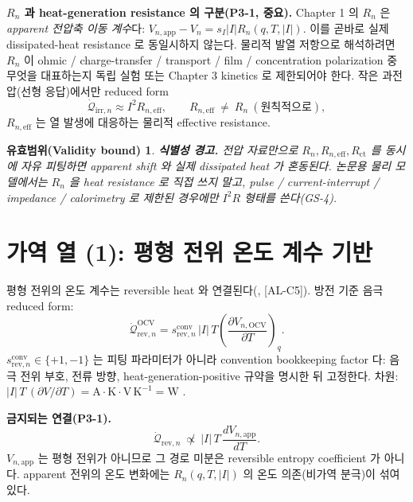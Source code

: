 \documentclass[11pt,a4paper]{article}
\newtheorem*{boundbox}{유효범위(Validity bound)}
\newcommand{\eff}{\mathrm{eff}}
\newcommand{\app}{\mathrm{app}}
\newcommand{\OCV}{\mathrm{OCV}}
\newcommand{\irr}{\mathrm{irr}}
\newcommand{\rev}{\mathrm{rev}}
\newcommand{\conv}{\mathrm{conv}}
\newcommand{\AL}[1]{\textsf{[AL-#1]}}
\begin{document}
\textbf{$R_n$ 과 heat-generation resistance 의 구분(P3-1, 중요).} Chapter 1 의 $R_n$ 은 \emph{apparent 전압축
이동 계수}다: $V_{n,\app}-V_n=s_I|I|R_n(q,T,|I|)$. 이를 곧바로 실제 dissipated-heat resistance 로
동일시하지 않는다. 물리적 발열 저항으로 해석하려면 $R_n$ 이 ohmic / charge-transfer / transport / film /
concentration polarization 중 무엇을 대표하는지 독립 실험 또는 Chapter 3 kinetics 로 제한되어야 한다.
작은 과전압(선형 응답)에서만 reduced form
\begin{equation}
\dot{\mathcal Q}_{\irr,n}\approx I^2R_{n,\eff},\qquad R_{n,\eff}\ \ne\ R_n\ (\text{원칙적으로}),
\label{eq:ch2_i2r}
\end{equation}
$R_{n,\eff}$ 는 열 발생에 대응하는 물리적 effective resistance.
\begin{boundbox}
\textbf{식별성 경고.} 전압 자료만으로 $R_n,R_{n,\eff},R_{\mathrm{ct}}$ 를 동시에 자유 피팅하면 apparent
shift 와 실제 dissipated heat 가 혼동된다. 논문용 물리 모델에서는 $R_n$ 을 heat resistance 로 직접 쓰지
말고, pulse / current-interrupt / impedance / calorimetry 로 제한된 경우에만 $I^2R$ 형태를 쓴다(GS-4).
\end{boundbox}

\section{가역 열 (1): 평형 전위 온도 계수 기반}\label{sec:ch2_revOCV}
평형 전위의 온도 계수는 reversible heat 와 연결된다(\cite{bernardi1985,thomasnewman2003}, \AL{C5}). 방전 기준
음극 reduced form:
\begin{equation}
\dot{\mathcal Q}_{\rev,n}^{\OCV}=s_{\rev,n}^{\conv}\,|I|\,T\left(\frac{\partial V_{n,\OCV}}{\partial T}\right)_q.
\label{eq:ch2_revOCV}
\end{equation}
$s_{\rev,n}^{\conv}\in\{+1,-1\}$ 는 피팅 파라미터가 아니라 convention bookkeeping factor 다: 음극 전위 부호,
전류 방향, heat-generation-positive 규약을 명시한 뒤 고정한다. 차원: $|I|\,T\,(\partial V/\partial T)=
\mathrm A\cdot\mathrm K\cdot\mathrm{V\,K^{-1}}=\mathrm{W}$ \checkmark.

\textbf{금지되는 연결(P3-1).}
\begin{equation}
\dot{\mathcal Q}_{\rev,n}\ \not\propto\ |I|\,T\,\frac{dV_{n,\app}}{dT}.
\label{eq:ch2_forbidden}
\end{equation}
$V_{n,\app}$ 는 평형 전위가 아니므로 그 경로 미분은 reversible entropy coefficient 가 아니다. apparent
전위의 온도 변화에는 $R_n(q,T,|I|)$ 의 온도 의존(비가역 분극)이 섞여 있다.
\end{document}
